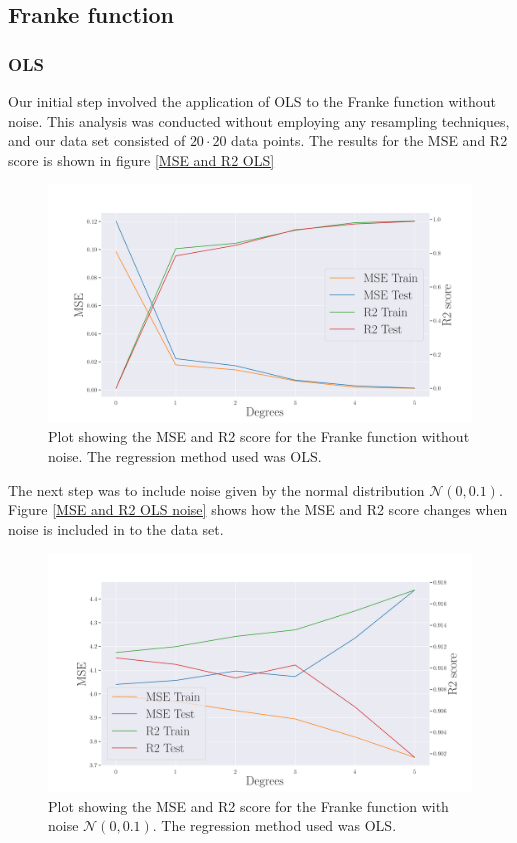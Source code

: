 \thispagestyle{plain}
\subsection{Franke function}
\subsubsection{OLS}
\noindent Our initial step involved the application of OLS to the Franke function without noise.	
This analysis was conducted without employing any resampling techniques, 
and our data set consisted of $20 \cdot 20$ data points. The results for the MSE and R2 score is shown in 
figure \eqref{MSE and R2 OLS}
%
\begin{figure}[H]
	\centering
	\includegraphics[width=\linewidth]{images/Figure_3.png}
	\caption{Plot showing the MSE and R2 score for the Franke function without noise. The regression method used was OLS.}
	\label{MSE and R2 OLS}
\end{figure}
\noindent The next step was to include noise given by the normal distribution $\mathcal{N}(0,0.1)$. Figure \eqref{MSE and R2 OLS noise} shows how the MSE and R2 score changes when noise is included in to the data set.
\begin{figure}[H]
	\centering
	\includegraphics[width=\linewidth]{images/Figure_4.png}
	\caption{Plot showing the MSE and R2 score for the Franke function with noise $\mathcal{N}(0,0.1)$. The regression method used was OLS.}
	\label{MSE and R2 OLS noise}
\end{figure}
